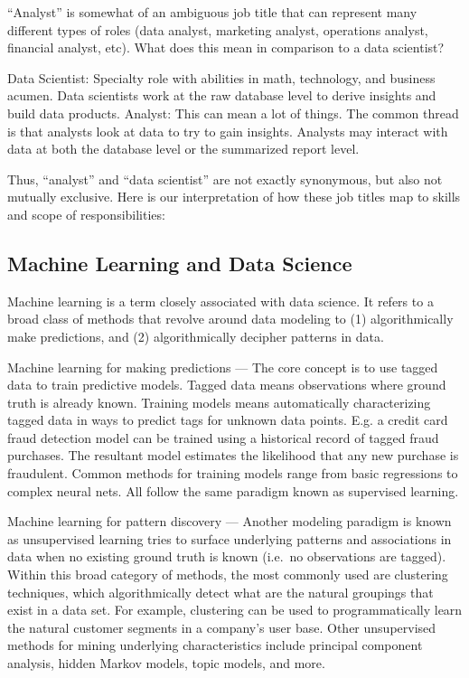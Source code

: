 \documentclass[
]{book}
\begin{document}
``Analyst'' is somewhat of an ambiguous job title that can represent many different types of roles (data analyst, marketing analyst, operations analyst, financial analyst, etc). What does this mean in comparison to a data scientist?

Data Scientist: Specialty role with abilities in math, technology, and business acumen. Data scientists work at the raw database level to derive insights and build data products.
Analyst: This can mean a lot of things. The common thread is that analysts look at data to try to gain insights. Analysts may interact with data at both the database level or the summarized report level.

Thus, ``analyst'' and ``data scientist'' are not exactly synonymous, but also not mutually exclusive. Here is our interpretation of how these job titles map to skills and scope of responsibilities:

\hypertarget{machine-learning-and-data-science}{%
\subsection*{Machine Learning and Data Science}\label{machine-learning-and-data-science}}


Machine learning is a term closely associated with data science. It refers to a broad class of methods that revolve around data modeling to (1) algorithmically make predictions, and (2) algorithmically decipher patterns in data.

Machine learning for making predictions --- The core concept is to use tagged data to train predictive models. Tagged data means observations where ground truth is already known. Training models means automatically characterizing tagged data in ways to predict tags for unknown data points. E.g. a credit card fraud detection model can be trained using a historical record of tagged fraud purchases. The resultant model estimates the likelihood that any new purchase is fraudulent. Common methods for training models range from basic regressions to complex neural nets. All follow the same paradigm known as supervised learning.

Machine learning for pattern discovery --- Another modeling paradigm is known as unsupervised learning tries to surface underlying patterns and associations in data when no existing ground truth is known (i.e.~no observations are tagged). Within this broad category of methods, the most commonly used are clustering techniques, which algorithmically detect what are the natural groupings that exist in a data set. For example, clustering can be used to programmatically learn the natural customer segments in a company's user base. Other unsupervised methods for mining underlying characteristics include principal component analysis, hidden Markov models, topic models, and more.
\end{document}
